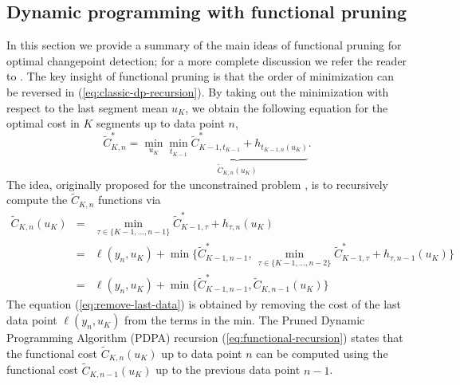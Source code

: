 \documentclass[twoside,11pt]{article}
\begin{document}
\subsection{Dynamic programming with functional pruning}
\label{sec:functional-pruning}

In this section we provide a summary of the main ideas of functional
pruning for optimal changepoint detection; for a more complete
discussion we refer the reader to \citep{fpop}. The key insight of
functional pruning is that the order of minimization can be reversed in
(\ref{eq:classic-dp-recursion}). By taking out the minimization with
respect to the last segment mean $u_K$, we obtain the following equation for the optimal cost in $K$ segments up to data point $n$,
\begin{equation}
  \tilde{C}^*_{K,n} = \min_{u_K} \underbrace{\min_{t_{K-1}} 
\tilde{C}^*_{K-1,t_{K-1}}
+  h_{t_{K-1,n}(u_K)}}_{\tilde{C}_{K,n}(u_K)}.
\end{equation}
The idea, originally proposed for the unconstrained problem
\citep{pruned-dp}, is to recursively compute the $\tilde{C}_{K,n}$
functions via
\begin{eqnarray}
\tilde{C}_{K,n}(u_K) 
&=& \min_{\tau\in\{K-1,\dots,n-1\}} \tilde{C}^*_{K-1,\tau} + h_{\tau,n}(u_K)
\\
&=& \ell(y_n, u_K) + \min\{\tilde{C}^*_{K-1,n-1},\, 
\min_{\tau\in\{K-1,\dots,n-2\}} \tilde{C}^*_{K-1,\tau} + h_{\tau,n-1}(u_K)
\}\label{eq:remove-last-data}\\
&=& \ell(y_n, u_K) + \min\{\tilde{C}^*_{K-1,n-1}, \tilde{C}_{K,n-1}(u_K)\}
\label{eq:functional-recursion}
\end{eqnarray}
The equation (\ref{eq:remove-last-data}) is obtained by removing the
cost of the last data point $\ell(y_n, u_K)$ from the terms in the
min. The Pruned Dynamic Programming Algorithm (PDPA) recursion
(\ref{eq:functional-recursion}) states that the functional cost
$\tilde{C}_{K,n}(u_K)$ up to data point $n$ can be computed using the
functional cost $\tilde{C}_{K,n-1}(u_K)$ up to the previous data point
$n-1$.
\end{document}
